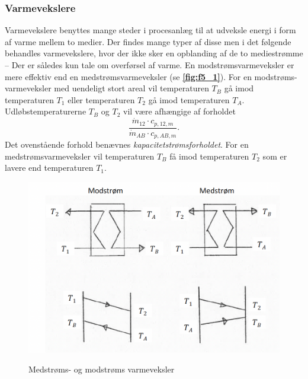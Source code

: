 \subsubsection{Varmevekslere}
Varmevekslere benyttes mange steder i procesanlæg til at udveksle energi i form af varme mellem to medier. Der findes mange typer af disse men i det følgende behandles varmevekslere, hvor der ikke sker en opblanding af de to mediestrømme -- Der er således kun tale om overførsel af varme. En modstrømsvarmeveksler er mere effektiv end en medstrømsvarmeveksler (se \textbf{\autoref{fig:f5_1}}). For en modstrøms-varmeveksler med uendeligt stort areal vil temperaturen $T_B$ gå imod temperaturen $T_1$ eller temperaturen $T_2$ gå imod temperaturen $T_A$. Udløbstemperaturerne $T_B$ og $T_2$ vil være afhængige af forholdet
\[ 
\frac{\dot{m}_{12} \cdot c_{p, 12, m}}{\dot{m}_{AB} \cdot c_{p, AB, m}}
.\]
Det ovenstående forhold benævnes \textit{kapacitetstrømsforholdet}. For en medstrømsvarmeveksler vil temperaturen $T_B$ få imod temperaturen $T_2$ som er lavere end temperaturen $T_1$. 
\begin{figure} [ht]
  \centering
  \caption{Medstrøms- og modstrøms varmeveksler}
  \includegraphics[width=0.5\linewidth]{./figures/f5_1.png}
  \label{fig:f5_1}
\end{figure}

